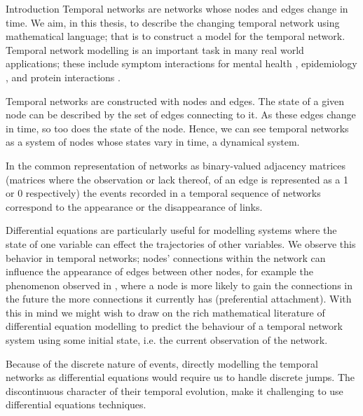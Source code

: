 \documentclass[12pt]{amsbook}
\begin{document}
\begin{chapter}{Introduction}
    Temporal networks are networks whose nodes and edges change in time. We aim, in this thesis, to describe the changing temporal network using mathematical language; that is to construct a model for the temporal network. 
    Temporal network modelling is an important task in many real world applications; these include symptom interactions for mental health \cite{jordan2020current,contreras2020temporal}, epidemiology \cite{masuda2013predicting}, and protein interactions \cite{lucas2021inferring,jin2009identifying}.

    Temporal networks are constructed with nodes and edges. The state of a given node can be described by the set of edges connecting to it. As these edges change in time, so too does the state of the node. Hence, we can see temporal networks as a system of nodes whose states vary in time, a dynamical system.

    In the common representation of networks as binary-valued adjacency matrices (matrices where the observation or lack thereof, of an edge is represented as a 1 or 0 respectively) the events recorded in a temporal sequence of networks correspond to the appearance or the disappearance of links.

    Differential equations are particularly useful for modelling systems where the state of one variable can effect the trajectories of other variables. We observe this behavior in temporal networks; nodes' connections within the network can influence the appearance of edges between other nodes, for example the phenomenon observed in \cite{newman2001clustering,capocci2006preferential}, where a node is more likely to gain the connections in the future the more connections it currently has (preferential attachment). With this in mind we might wish to draw on the rich mathematical literature of differential equation modelling to predict the behaviour of a temporal network system using some initial state, i.e. the current observation of the network.
   
    Because of the discrete nature of events, directly modelling the temporal networks as differential equations would require us to handle discrete jumps. The discontinuous character of their temporal evolution, make it challenging to use differential equations techniques.


\end{chapter}
\end{document}
